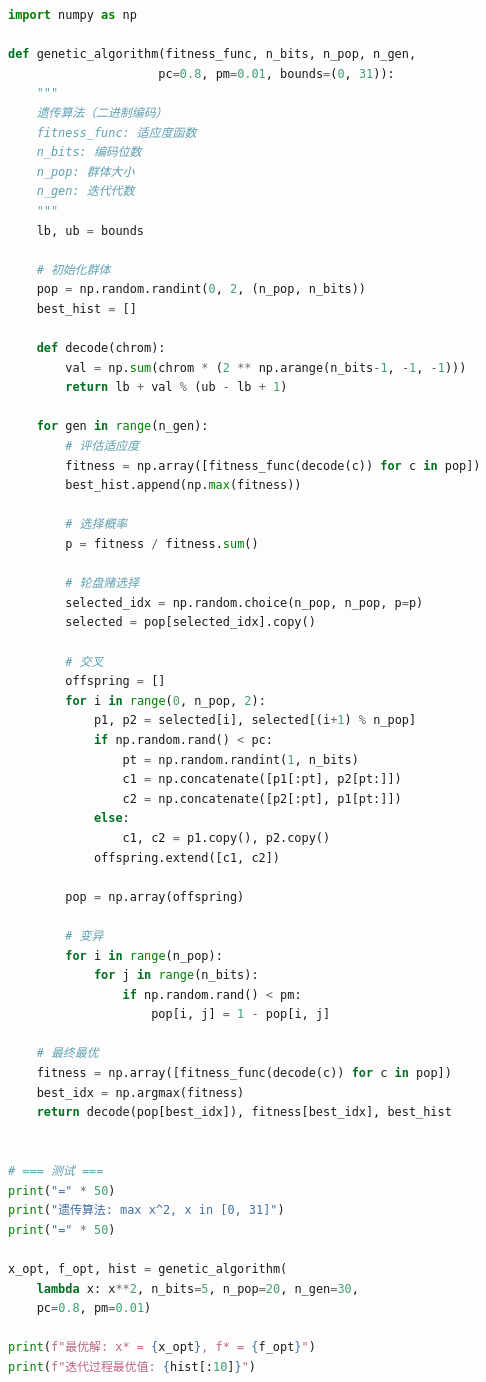 \begin{lstlisting}[language=Python, caption=遗传算法实现]
import numpy as np

def genetic_algorithm(fitness_func, n_bits, n_pop, n_gen,
                     pc=0.8, pm=0.01, bounds=(0, 31)):
    """
    遗传算法（二进制编码）
    fitness_func: 适应度函数
    n_bits: 编码位数
    n_pop: 群体大小
    n_gen: 迭代代数
    """
    lb, ub = bounds
    
    # 初始化群体
    pop = np.random.randint(0, 2, (n_pop, n_bits))
    best_hist = []
    
    def decode(chrom):
        val = np.sum(chrom * (2 ** np.arange(n_bits-1, -1, -1)))
        return lb + val % (ub - lb + 1)
    
    for gen in range(n_gen):
        # 评估适应度
        fitness = np.array([fitness_func(decode(c)) for c in pop])
        best_hist.append(np.max(fitness))
        
        # 选择概率
        p = fitness / fitness.sum()
        
        # 轮盘赌选择
        selected_idx = np.random.choice(n_pop, n_pop, p=p)
        selected = pop[selected_idx].copy()
        
        # 交叉
        offspring = []
        for i in range(0, n_pop, 2):
            p1, p2 = selected[i], selected[(i+1) % n_pop]
            if np.random.rand() < pc:
                pt = np.random.randint(1, n_bits)
                c1 = np.concatenate([p1[:pt], p2[pt:]])
                c2 = np.concatenate([p2[:pt], p1[pt:]])
            else:
                c1, c2 = p1.copy(), p2.copy()
            offspring.extend([c1, c2])
        
        pop = np.array(offspring)
        
        # 变异
        for i in range(n_pop):
            for j in range(n_bits):
                if np.random.rand() < pm:
                    pop[i, j] = 1 - pop[i, j]
    
    # 最终最优
    fitness = np.array([fitness_func(decode(c)) for c in pop])
    best_idx = np.argmax(fitness)
    return decode(pop[best_idx]), fitness[best_idx], best_hist


# === 测试 ===
print("=" * 50)
print("遗传算法: max x^2, x in [0, 31]")
print("=" * 50)

x_opt, f_opt, hist = genetic_algorithm(
    lambda x: x**2, n_bits=5, n_pop=20, n_gen=30,
    pc=0.8, pm=0.01)

print(f"最优解: x* = {x_opt}, f* = {f_opt}")
print(f"迭代过程最优值: {hist[:10]}")
\end{lstlisting}

